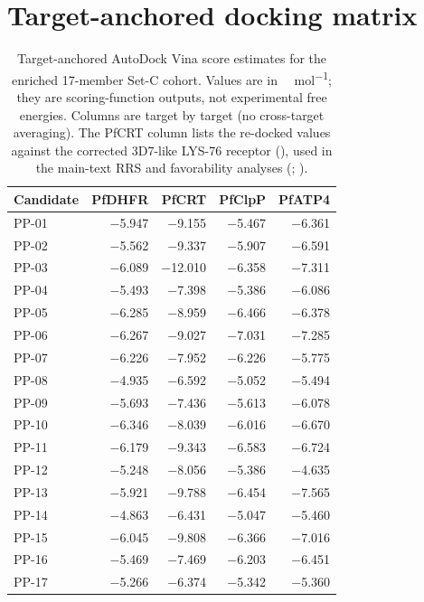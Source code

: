 \documentclass[11pt,a4paper]{article}
\begin{document}
	\section{Target-anchored docking matrix}\label{sec:sm_vina_matrix}
	\begin{table}[ht!]
		\centering
		\caption{Target-anchored AutoDock Vina score estimates for the enriched 17-member Set-C cohort. Values are in \si{\kilo\calorie\per\mol}; they are scoring-function outputs, not experimental free energies. Columns are target by target (no cross-target averaging). The PfCRT column lists the re-docked values against the corrected 3D7-like LYS-76 receptor (), used in the main-text RRS and favorability analyses (; ).}
		\label{tab:vina}
		\small
		\begin{tabular}{@{}lrrrr@{}}
			\toprule
			Candidate & PfDHFR & PfCRT & PfClpP & PfATP4 \\
			\midrule
			PP-01 & \num{-5.947} & \num{-9.155} & \num{-5.467} & \num{-6.361} \\
			PP-02 & \num{-5.562} & \num{-9.337} & \num{-5.907} & \num{-6.591} \\
			PP-03 & \num{-6.089} & \num{-12.010} & \num{-6.358} & \num{-7.311} \\
			PP-04 & \num{-5.493} & \num{-7.398} & \num{-5.386} & \num{-6.086} \\
			PP-05 & \num{-6.285} & \num{-8.959} & \num{-6.466} & \num{-6.378} \\
			PP-06 & \num{-6.267} & \num{-9.027} & \num{-7.031} & \num{-7.285} \\
			PP-07 & \num{-6.226} & \num{-7.952} & \num{-6.226} & \num{-5.775} \\
			PP-08 & \num{-4.935} & \num{-6.592} & \num{-5.052} & \num{-5.494} \\
			PP-09 & \num{-5.693} & \num{-7.436} & \num{-5.613} & \num{-6.078} \\
			PP-10 & \num{-6.346} & \num{-8.039} & \num{-6.016} & \num{-6.670} \\
			PP-11 & \num{-6.179} & \num{-9.343} & \num{-6.583} & \num{-6.724} \\
			PP-12 & \num{-5.248} & \num{-8.056} & \num{-5.386} & \num{-4.635} \\
			PP-13 & \num{-5.921} & \num{-9.788} & \num{-6.454} & \num{-7.565} \\
			PP-14 & \num{-4.863} & \num{-6.431} & \num{-5.047} & \num{-5.460} \\
			PP-15 & \num{-6.045} & \num{-9.808} & \num{-6.366} & \num{-7.016} \\
			PP-16 & \num{-5.469} & \num{-7.469} & \num{-6.203} & \num{-6.451} \\
			PP-17 & \num{-5.266} & \num{-6.374} & \num{-5.342} & \num{-5.360} \\
			\bottomrule
		\end{tabular}
	\end{table}
	
\end{document}
